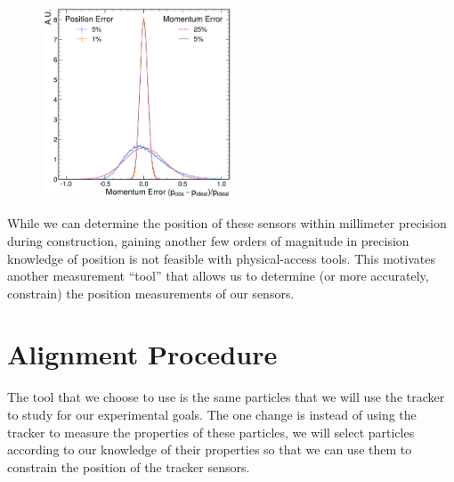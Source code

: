 \begin{figure}
	\centering
	\includegraphics[width=0.5\textwidth]{one-offs/position-momentum-uncertainty/momentum-error-from-position-error.pdf}
	\caption{}
	\label{fig:momentum-error-from-position-error}
\end{figure}


While we can determine the position of these sensors within millimeter precision
during construction, gaining another few orders of magnitude in precision knowledge
of position is not feasible with physical-access tools.
This motivates another measurement ``tool'' that allows us to determine
(or more accurately, constrain) the position measurements of our sensors.

\section{Alignment Procedure}
The tool that we choose to use is the same particles that we will use the tracker
to study for our experimental goals.
The one change is instead of using the tracker to measure the properties of these particles,
we will select particles according to our knowledge of their properties so that we can use
them to constrain the position of the tracker sensors.
